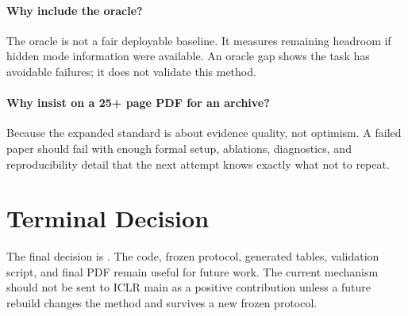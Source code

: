 \documentclass{article}
\begin{document}
\paragraph{Why include the oracle?}
The oracle is not a fair deployable baseline. It measures remaining headroom if hidden mode information were available. An oracle gap shows the task has avoidable failures; it does not validate this method.

\paragraph{Why insist on a 25+ page PDF for an archive?}
Because the expanded standard is about evidence quality, not optimism. A failed paper should fail with enough formal setup, ablations, diagnostics, and reproducibility detail that the next attempt knows exactly what not to repeat.

\section{Terminal Decision}

The final decision is \PaperDecision{}. The code, frozen protocol, generated tables, validation script, and final PDF remain useful for future work. The current mechanism should not be sent to ICLR main as a positive contribution unless a future rebuild changes the method and survives a new frozen protocol.



\end{document}
